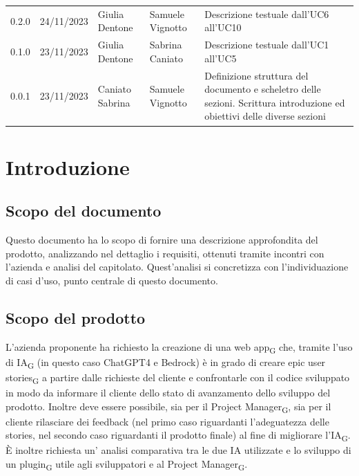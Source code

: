 \documentclass{article}
\begin{document}
\begin{center}
\begin{tabular}{P{4em} P{6em} P{7em} P{7em} P{11em}}
    0.2.0 & 24/11/2023 & Giulia Dentone & Samuele Vignotto & Descrizione testuale dall'UC6 all'UC10\\ 
    0.1.0 & 23/11/2023 & Giulia Dentone & Sabrina Caniato & Descrizione testuale dall'UC1 all'UC5 \\
    0.0.1 & 23/11/2023 & Caniato Sabrina  & Samuele Vignotto & Definizione struttura del documento e scheletro delle sezioni. Scrittura introduzione ed obiettivi delle diverse sezioni\\ 
\end{tabular}
\end{center}
\newpage
\tableofcontents
\listoffigures
\newpage
\section*{Introduzione}

\subsection*{Scopo del documento}

Questo documento ha lo scopo di fornire una descrizione approfondita del prodotto, analizzando nel dettaglio i requisiti, ottenuti tramite incontri con l'azienda e analisi del capitolato. Quest'analisi si concretizza con l'individuazione di casi d'uso, punto centrale di questo documento.


\subsection*{Scopo del prodotto}
L'azienda proponente ha richiesto la creazione di una web app\textsubscript{G} che, tramite l'uso di IA\textsubscript{G} (in questo caso ChatGPT4 e Bedrock) è in grado di creare epic user stories\textsubscript{G} a partire dalle richieste del cliente e confrontarle con il codice sviluppato in modo da informare il cliente dello stato di avanzamento dello sviluppo del prodotto. Inoltre deve essere possibile, sia per il Project Manager\textsubscript{G}, sia per il cliente rilasciare dei feedback (nel primo caso riguardanti l'adeguatezza delle stories, nel secondo caso riguardanti il prodotto finale) al fine di migliorare l'IA\textsubscript{G}. È inoltre richiesta un' analisi comparativa tra le due IA utilizzate e lo sviluppo di un plugin\textsubscript{G} utile agli sviluppatori e al Project Manager\textsubscript{G}.
\end{document}
